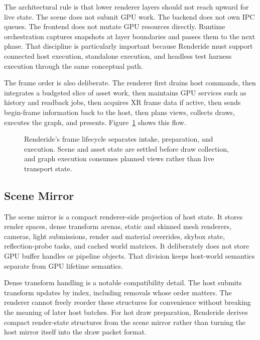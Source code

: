 \documentclass[acmtog,screen,nonacm]{acmart}
\begin{document}
The architectural rule is that lower renderer layers should not reach upward for live state. The scene does not submit GPU work. The backend does not own IPC queues. The frontend does not mutate GPU resources directly. Runtime orchestration captures snapshots at layer boundaries and passes them to the next phase. That discipline is particularly important because Renderide must support connected host execution, standalone execution, and headless test harness execution through the same conceptual path.

The frame order is also deliberate. The renderer first drains host commands, then integrates a budgeted slice of asset work, then maintains GPU services such as history and readback jobs, then acquires XR frame data if active, then sends begin-frame information back to the host, then plans views, collects draws, executes the graph, and presents. Figure~\ref{fig:frame} shows this flow.

\begin{figure}
  \centering
  \resizebox{0.96\textwidth}{!}{}
  \caption{Renderide's frame lifecycle separates intake, preparation, and execution. Scene and asset state are settled before draw collection, and graph execution consumes planned views rather than live transport state.}
  \label{fig:frame}
\end{figure}

\subsection{Scene Mirror}

The scene mirror is a compact renderer-side projection of host state. It stores render spaces, dense transform arenas, static and skinned mesh renderers, cameras, light submissions, render and material overrides, skybox state, reflection-probe tasks, and cached world matrices. It deliberately does not store GPU buffer handles or pipeline objects. That division keeps host-world semantics separate from GPU lifetime semantics.

Dense transform handling is a notable compatibility detail. The host submits transform updates by index, including removals whose order matters. The renderer cannot freely reorder these structures for convenience without breaking the meaning of later host batches. For hot draw preparation, Renderide derives compact render-state structures from the scene mirror rather than turning the host mirror itself into the draw packet format.
\end{document}
